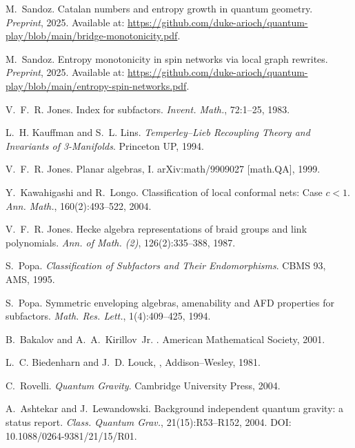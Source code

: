 \documentclass[11pt]{article}
\begin{document}

\begin{thebibliography}{9}

M.~Sandoz.
\newblock Catalan numbers and entropy growth in quantum geometry.
\newblock \emph{Preprint}, 2025.
\newblock Available at: \url{https://github.com/duke-arioch/quantum-play/blob/main/bridge-monotonicity.pdf}.

M.~Sandoz.
\newblock Entropy monotonicity in spin networks via local graph rewrites.
\newblock \emph{Preprint}, 2025.
\newblock Available at: \url{https://github.com/duke-arioch/quantum-play/blob/main/entropy-spin-networks.pdf}.

V.~F.~R. Jones.
\newblock Index for subfactors.
\newblock \emph{Invent. Math.}, 72:1–25, 1983.

L.~H. Kauffman and S.~L. Lins.
\newblock \emph{Temperley–Lieb Recoupling Theory and Invariants of 3-Manifolds}.
\newblock Princeton UP, 1994.

V.~F.~R. Jones.
\newblock Planar algebras, I.
\newblock arXiv:math/9909027 [math.QA], 1999.

Y.~Kawahigashi and R.~Longo.
\newblock Classification of local conformal nets: Case $c < 1$.
\newblock \emph{Ann. Math.}, 160(2):493--522, 2004.

V.~F.~R. Jones.
\newblock Hecke algebra representations of braid groups and link polynomials.
\newblock \emph{Ann. of Math. (2)}, 126(2):335--388, 1987.

S.~Popa.
\newblock \emph{Classification of Subfactors and Their Endomorphisms}.
\newblock CBMS 93, AMS, 1995.

S.~Popa.
\newblock Symmetric enveloping algebras, amenability and AFD properties for subfactors.
\newblock \emph{Math. Res. Lett.}, 1(4):409--425, 1994.

  B.~Bakalov and A.~A.~Kirillov~Jr.
  .
  \newblock American Mathematical Society, 2001.

L.~C. Biedenharn and J.~D. Louck,
,
\newblock Addison–Wesley, 1981.

C.~Rovelli.
\newblock \emph{Quantum Gravity}.
\newblock Cambridge University Press, 2004.

A.~Ashtekar and J.~Lewandowski.
\newblock Background independent quantum gravity: a status report.
\newblock \emph{Class. Quantum Grav.}, 21(15):R53--R152, 2004.
\newblock DOI: 10.1088/0264-9381/21/15/R01.


\end{thebibliography}
\end{document}
